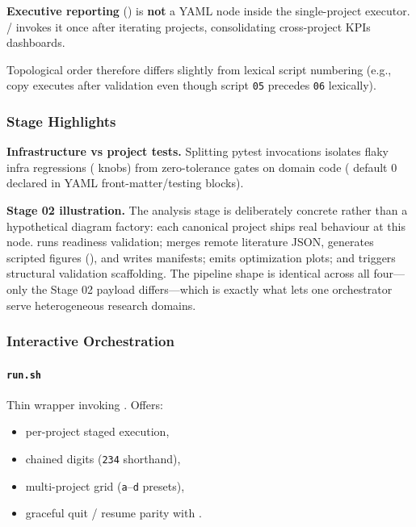 \documentclass[
]{article}
\providecommand{\tightlist}{%
  \setlength{\itemsep}{0pt}\setlength{\parskip}{0pt}}
\begin{document}
\textbf{Executive reporting}
() is \textbf{not} a
YAML node inside the single-project executor. 
/  invokes it once after iterating
projects, consolidating cross-project KPIs dashboards.

Topological order therefore differs slightly from lexical script
numbering (e.g., copy executes after validation even though script
\texttt{05} precedes \texttt{06} lexically).

\subsubsection{Stage Highlights}\label{stage-highlights}

\textbf{Infrastructure vs project tests.} Splitting pytest invocations
isolates flaky infra regressions ( knobs)
from zero-tolerance gates on domain code
( default 0 declared in YAML
front-matter/testing blocks).

\textbf{Stage 02 illustration.} The analysis stage is deliberately
concrete rather than a hypothetical diagram factory: each canonical
project ships real behaviour at this node.
 runs readiness validation;
 merges remote literature JSON,
generates scripted figures (),
and writes manifests;  emits
optimization plots; and  triggers
structural validation scaffolding. The pipeline shape is identical
across all four---only the Stage 02 payload differs---which is exactly
what lets one orchestrator serve heterogeneous research domains.

\subsubsection{Interactive
Orchestration}\label{interactive-orchestration}

\paragraph{\texorpdfstring{\texttt{run.sh}}{run.sh}}\label{run.sh}

Thin wrapper invoking .
Offers:

\begin{itemize}
\tightlist
\item
  per-project staged execution,
\item
  chained digits (\texttt{234} shorthand),
\item
  multi-project grid (\texttt{a}--\texttt{d} presets),
\item
  graceful quit / resume parity with .
\end{itemize}
\end{document}

